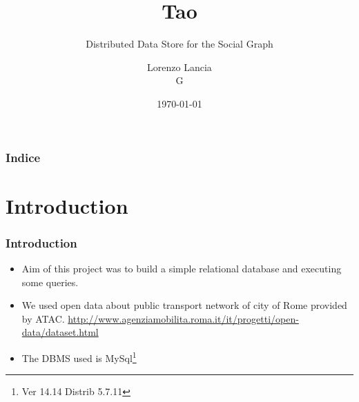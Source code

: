 \documentclass{beamer}
\title[Fb Tao]{
   Tao }
\subtitle{Distributed Data Store for the Social Graph}
\author[L. Lancia \& G]{
  Lorenzo Lancia \\ G\medskip
  }
\institute[Sapienza Università di Roma]{
  Master Degree in Data Science \\
  Sapienza Università di Roma}
\date[\today]{
 \today}
\begin{document}
\begin{frame}
  \titlepage
\end{frame}

\begin{frame}
  \frametitle{Indice}

  \tableofcontents
\end{frame}

\section{Introduction}
\begin{frame}
  \frametitle{Introduction}
  \begin{itemize}
  \item Aim of this project was to build a simple relational database
    and executing some queries.

    \item We used open data about public transport network of city of Rome
    provided by ATAC. \url{http://www.agenziamobilita.roma.it/it/progetti/open-data/dataset.html}
  
   \item The DBMS used is MySql\footnote{Ver 14.14 Distrib 5.7.11}
  \end{itemize}

 \end{frame}
\end{document}
